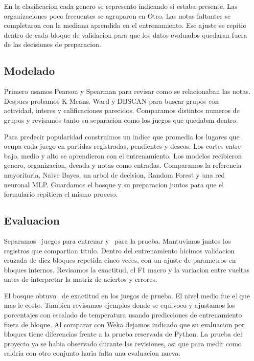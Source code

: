 \documentclass[letterpaper,11pt]{article}
\begin{document}
En la clasificacion cada genero se represento indicando si estaba presente. Las organizaciones poco frecuentes se agruparon en Otro. Las notas faltantes se completaron con la mediana aprendida en el entrenamiento. Ese ajuste se repitio dentro de cada bloque de validacion para que los datos evaluados quedaran fuera de las decisiones de preparacion.

\subsection{Modelado}
Primero usamos Pearson y Spearman para revisar como se relacionaban las notas. Despues probamos K-Means, Ward y DBSCAN para buscar grupos con actividad, interes y calificaciones parecidos. Comparamos distintos numeros de grupos y revisamos tanto su separacion como los juegos que quedaban dentro.

Para predecir popularidad construimos un indice que promedia los lugares que ocupa cada juego en partidas registradas, pendientes y deseos. Los cortes entre bajo, medio y alto se aprendieron con el entrenamiento. Los modelos recibieron genero, organizacion, decada y notas como entradas. Comparamos la referencia mayoritaria, Naive Bayes, un arbol de decision, Random Forest y una red neuronal MLP. Guardamos el bosque y su preparacion juntos para que el formulario repitiera el mismo proceso.

\subsection{Evaluacion}
Separamos \JuegosCalibracion\ juegos para entrenar y \JuegosPrueba\ para la prueba. Mantuvimos juntos los registros que compartian titulo. Dentro del entrenamiento hicimos validacion cruzada de diez bloques repetida cinco veces, con un ajuste de parametros en bloques internos. Revisamos la exactitud, el F1 macro y la variacion entre vueltas antes de interpretar la matriz de aciertos y errores.

El bosque obtuvo \ExactitudPrueba\ de exactitud en los juegos de prueba. El nivel medio fue el que mas le costo. Tambien revisamos ejemplos donde se equivoco y ajustamos los porcentajes con escalado de temperatura usando predicciones de entrenamiento fuera de bloque. Al comparar con Weka dejamos indicado que su evaluacion por bloques tiene diferencias frente a la prueba reservada de Python. La prueba del proyecto ya se habia observado durante las revisiones, asi que para medir como saldria con otro conjunto haria falta una evaluacion nueva.
\end{document}
